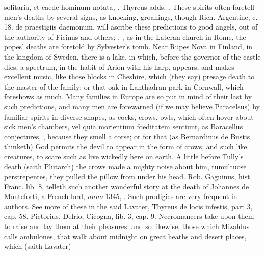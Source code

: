 {{{solitaria, et caede hominum notata}, \etc{}. Thyreus
adds, . These
spirits often foretell men's deaths by several signs, as knocking,
groanings, \etc{} though Rich. Argentine, c. 18. \textlatin{de praestigiis
daemonum}, will ascribe these predictions to good angels, out of the
authority of Ficinus and others; , \etc{}, as in the Lateran church in Rome, the popes'
deaths are foretold by Sylvester's tomb. Near Rupes Nova in Finland, in
the kingdom of Sweden, there is a lake, in which, before the governor
of the castle dies, a spectrum, in the habit of Arion with his harp,
appears, and makes excellent music, like those blocks in Cheshire,
which (they say) presage death to the master of the family; or that
oak in Lanthadran park in Cornwall, which foreshows as much. Many
families in Europe are so put in mind of their last by such
predictions, and many men are forewarned (if we may believe Paracelsus)
by familiar spirits in diverse shapes, as cocks, crows, owls, which
often hover about sick men's chambers, vel quia morientium foeditatem
sentiunt, as Baracellus conjectures, , because they smell a corse; or for that (as
Bernardinus de Bustis thinketh) God permits the devil to appear
in the form of crows, and such like creatures, to scare such as live
wickedly here on earth. A little before Tully's death (saith Plutarch)
the crows made a mighty noise about him, tumultuose perstrepentes, they
pulled the pillow from under his head. Rob. Gaguinus, hist. Franc. lib.
8, telleth such another wonderful story at the death of Johannes de
Monteforti, a French lord, \emph{anno} 1345, . Such prodigies are very frequent in
authors. See more of these in the said Lavater, \textlatin{Thyreus de locis
infestis, part 3, cap. 58. Pictorius, Delrio, Cicogna, lib. 3, cap. 9.}
Necromancers take upon them to raise and lay them at their pleasures:
and so likewise, those which Mizaldus calls ambulones, that walk about
midnight on great heaths and desert places, which (saith Lavater)
}}
